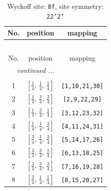 \documentclass[fleqn,8pt]{jsarticle}
\begin{document}
\begin{longtable}{ccc}
\caption{Wyckoff site: {\tt 8f}, site symmetry: {\tt 22'2'}}
 \\
 \hline \hline
No. & position & mapping \\ \hline \endfirsthead

\multicolumn{2}{l}{\tablename\ \thetable{}} \\
 \hline \hline
No. & position & mapping \\ \hline \endhead

 \hline \hline
\multicolumn{2}{r}{\footnotesize\it continued ...} \\ \endfoot

 \hline \hline
\multicolumn{2}{r}{} \\ \endlastfoot

1 & $\left[ \frac{1}{4},\, \frac{1}{4},\, \frac{1}{4} \right]$ & {\tt [1,10,21,30]} \\ \hline
2 & $\left[ \frac{1}{4},\, \frac{3}{4},\, \frac{3}{4} \right]$ & {\tt [2,9,22,29]} \\ \hline
3 & $\left[ \frac{1}{4},\, \frac{3}{4},\, \frac{1}{4} \right]$ & {\tt [3,12,23,32]} \\ \hline
4 & $\left[ \frac{1}{4},\, \frac{1}{4},\, \frac{3}{4} \right]$ & {\tt [4,11,24,31]} \\ \hline
5 & $\left[ \frac{3}{4},\, \frac{1}{4},\, \frac{3}{4} \right]$ & {\tt [5,14,17,26]} \\ \hline
6 & $\left[ \frac{3}{4},\, \frac{3}{4},\, \frac{1}{4} \right]$ & {\tt [6,13,18,25]} \\ \hline
7 & $\left[ \frac{3}{4},\, \frac{3}{4},\, \frac{3}{4} \right]$ & {\tt [7,16,19,28]} \\ \hline
8 & $\left[ \frac{3}{4},\, \frac{1}{4},\, \frac{1}{4} \right]$ & {\tt [8,15,20,27]} \\
\end{longtable}
\renewcommand{\arraystretch}{1.2}
\end{document}
